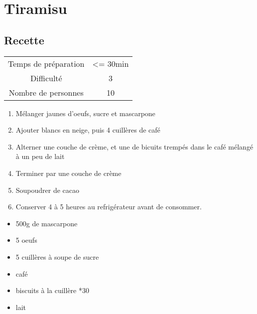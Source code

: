 \newpage
\section{Tiramisu}
    \label{sec:Tiramisu}
    \subsection{Recette}
    \vspace{1cm}


    \begin{center}
        \begin{tabular}{c|c}
            Temps de préparation & <= 30min \\
            Difficulté & 3 \\
            Nombre de personnes & 10 
        \end{tabular}
    \end{center}{}

    \vspace{1cm}
    \hline
    \vspace{1cm}

    \begin{minipage}{.7\textwidth}
        \begin{enumerate}
            \item Mélanger jaunes d'oeufs, sucre et mascarpone
	    \item Ajouter blancs en neige, puis 4 cuillères de café
	    \item Alterner une couche de crème, et une de bicuits trempés dans le café mélangé à un peu de lait
	    \item Terminer par une couche de crème
	    \item Soupoudrer de cacao
	    \item Conserver 4 à 5 heures au refrigérateur avant de consommer.

        \end{enumerate}
    \end{minipage}
    \begin{minipage}{.3\textwidth}
        \begin{flushleft}
        \begin{itemize}
            \item 500g de mascarpone
	    \item 5 oeufs
	    \item 5 cuillères à soupe de sucre
	    \item café
	    \item biscuits à la cuillère *30
	    \item lait

        \end{itemize}
        \end{flushleft}
    \end{minipage}
    
